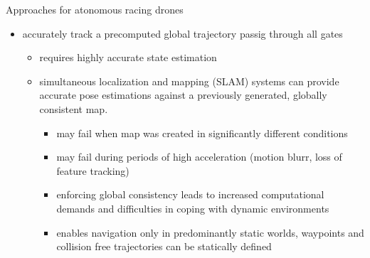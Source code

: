 Approaches for atonomous racing drones
\begin{itemize}
    \item accurately track a precomputed global trajectory passig through all gates
    \begin{itemize}
        \item requires highly accurate state estimation
        \item simultaneous localization and mapping (SLAM) systems can provide accurate pose estimations against a previously generated, globally consistent map.
        \begin{itemize}
            \item may fail when map was created in significantly different conditions
            \item may fail during periods of high acceleration (motion blurr, loss of feature tracking)
            \item enforcing global consistency leads to increased computational demands and difficulties in coping with dynamic environments
            \item enables navigation only in predominantly static worlds, waypoints and collision free trajectories can be statically defined
        \end{itemize}        
    \end{itemize}    
\end{itemize}


